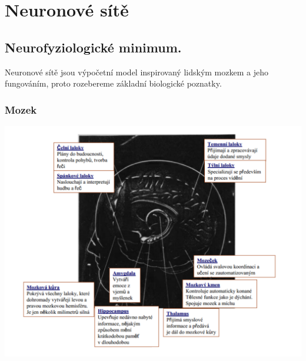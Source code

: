 \documentclass[11pt]{report} %
\begin{document}
\chapter{Neuronové sítě}
\section{Neurofyziologické minimum.}
Neuronové sítě jsou výpočetní model inspirovaný lidským mozkem a jeho fungováním, proto rozebereme základní biologické poznatky.

\subsection{Mozek}

\includegraphics[width=\textwidth]{img/mozek.png}
\end{document}
